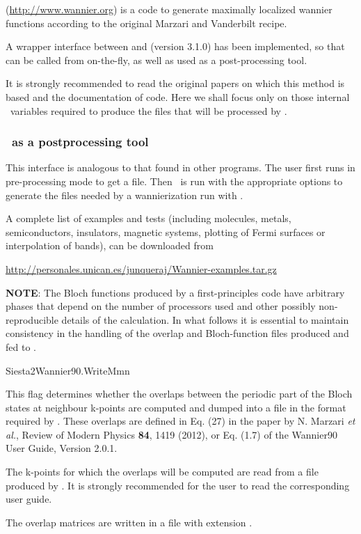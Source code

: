 
   (\url{http://www.wannier.org}) is a code to generate
  maximally localized wannier functions according to the original
  Marzari and Vanderbilt recipe.

  A wrapper interface between  and 
  (version 3.1.0) has been implemented, so that  can
  be called from  on-the-fly, as well as used as a
  post-processing tool.

  It is strongly recommended to read the original papers on which this
  method is based and the  documentation of  code.
  Here we shall focus only on those internal \siesta\ variables
  required to produce the files that will be processed
  by .

  \subsubsection{\, as a postprocessing tool}

  This interface is analogous to that found in other programs. The user
  first runs  in pre-processing mode to get a  file.
  Then \siesta\ is run with the appropriate options to generate the files needed
  by a wannierization run with .

  A complete list of examples and tests (including molecules, metals,
  semiconductors, insulators, magnetic systems, plotting of Fermi surfaces
  or interpolation of bands), can be downloaded from

   \url{http://personales.unican.es/junqueraj/Wannier-examples.tar.gz}

  \textbf{NOTE}: The Bloch functions produced by a first-principles code
        have arbitrary phases that depend on the number of processors
        used and other possibly non-reproducible details of the
        calculation. In what follows it is essential to maintain
        consistency in the handling of the overlap and Bloch-function
        files produced and fed to .


  \begin{fdflogicalF}{Siesta2Wannier90.WriteMmn}

    This flag determines whether the overlaps between the periodic part
    of the Bloch states at neighbour k-points are computed and dumped
    into a file in the format required by .  These
    overlaps are defined in Eq. (27) in the paper by N. Marzari
    \textit{et al.}, Review of Modern Physics \textbf{84}, 1419 (2012),
    or Eq. (1.7) of the Wannier90 User Guide, Version 2.0.1.

    The k-points for which the overlaps will be computed are read from a
     file produced by . It is strongly
    recommended for the user to read the corresponding user guide.

    The overlap matrices are written in a file with extension
    .

  \end{fdflogicalF}

